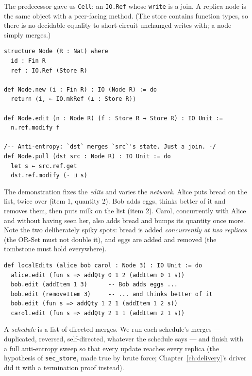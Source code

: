\documentclass[12pt, a4paper, openright]{book}
\theoremstyle{thmstyle}
\theoremstyle{defstyle}
\newcommand{\lc}[1]{\texttt{#1}}
\begin{document}
The predecessor gave us \lc{Cell}: an \lc{IO.Ref} whose \lc{write} is a
join. A replica node is the same object with a peer-facing method. (The
store contains function types, so there is no decidable equality to
short-circuit unchanged writes with; a node simply merges.)

\begin{verbatim}
structure Node (R : Nat) where
  id : Fin R
  ref : IO.Ref (Store R)

def Node.new (i : Fin R) : IO (Node R) := do
  return ⟨i, ← IO.mkRef (⊥ : Store R)⟩

def Node.edit (n : Node R) (f : Store R → Store R) : IO Unit :=
  n.ref.modify f

/-- Anti-entropy: `dst` merges `src`'s state. Just a join. -/
def Node.pull (dst src : Node R) : IO Unit := do
  let s ← src.ref.get
  dst.ref.modify (· ⊔ s)
\end{verbatim}

The demonstration fixes the \emph{edits} and varies the \emph{network}.
Alice puts bread on the list, twice over (item 1, quantity 2). Bob adds
eggs, thinks better of it and removes them, then puts milk on the list
(item 2). Carol, concurrently with Alice and without having seen her,
also adds bread and bumps its quantity once more. Note the two
deliberately spiky spots: bread is added \emph{concurrently at two
replicas} (the OR-Set must not double it), and eggs are added and
removed (the tombstone must hold everywhere).

\begin{verbatim}
def localEdits (alice bob carol : Node 3) : IO Unit := do
  alice.edit (fun s => addQty 0 1 2 (addItem 0 1 s))
  bob.edit (addItem 1 3)      -- Bob adds eggs ...
  bob.edit (removeItem 3)     -- ... and thinks better of it
  bob.edit (fun s => addQty 1 2 1 (addItem 1 2 s))
  carol.edit (fun s => addQty 2 1 1 (addItem 2 1 s))
\end{verbatim}

A \emph{schedule} is a list of directed merges. We run each schedule's
merges --- duplicated, reversed, self-directed, whatever the schedule
says --- and finish with a full anti-entropy sweep so that every update
reaches every replica (the hypothesis of \lc{sec_store}, made true by
brute force; Chapter~\ref{ch:delivery}'s driver did it with a
termination proof instead).
\end{document}
